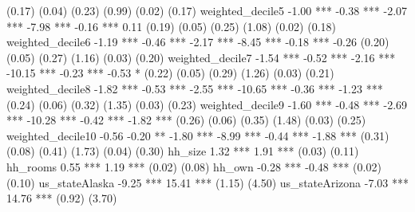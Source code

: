                                    (0.17)        (0.04)        (0.23)        (0.99)         (0.02)         (0.17)   
weighted_decile5                   -1.00 ***     -0.38 ***     -2.07 ***     -7.98 ***      -0.16 ***       0.11    
                                   (0.19)        (0.05)        (0.25)        (1.08)         (0.02)         (0.18)   
weighted_decile6                   -1.19 ***     -0.46 ***     -2.17 ***     -8.45 ***      -0.18 ***      -0.26    
                                   (0.20)        (0.05)        (0.27)        (1.16)         (0.03)         (0.20)   
weighted_decile7                   -1.54 ***     -0.52 ***     -2.16 ***    -10.15 ***      -0.23 ***      -0.53 *  
                                   (0.22)        (0.05)        (0.29)        (1.26)         (0.03)         (0.21)   
weighted_decile8                   -1.82 ***     -0.53 ***     -2.55 ***    -10.65 ***      -0.36 ***      -1.23 ***
                                   (0.24)        (0.06)        (0.32)        (1.35)         (0.03)         (0.23)   
weighted_decile9                   -1.60 ***     -0.48 ***     -2.69 ***    -10.28 ***      -0.42 ***      -1.82 ***
                                   (0.26)        (0.06)        (0.35)        (1.48)         (0.03)         (0.25)   
weighted_decile10                  -0.56         -0.20 **      -1.80 ***     -8.99 ***      -0.44 ***      -1.88 ***
                                   (0.31)        (0.08)        (0.41)        (1.73)         (0.04)         (0.30)   
hh_size                                                         1.32 ***      1.91 ***                              
                                                               (0.03)        (0.11)                                 
hh_rooms                                                        0.55 ***      1.19 ***                              
                                                               (0.02)        (0.08)                                 
hh_own                                                         -0.28 ***     -0.48 ***                              
                                                               (0.02)        (0.10)                                 
us_stateAlaska                                                 -9.25 ***     15.41 ***                              
                                                               (1.15)        (4.50)                                 
us_stateArizona                                                -7.03 ***     14.76 ***                              
                                                               (0.92)        (3.70)                                 

